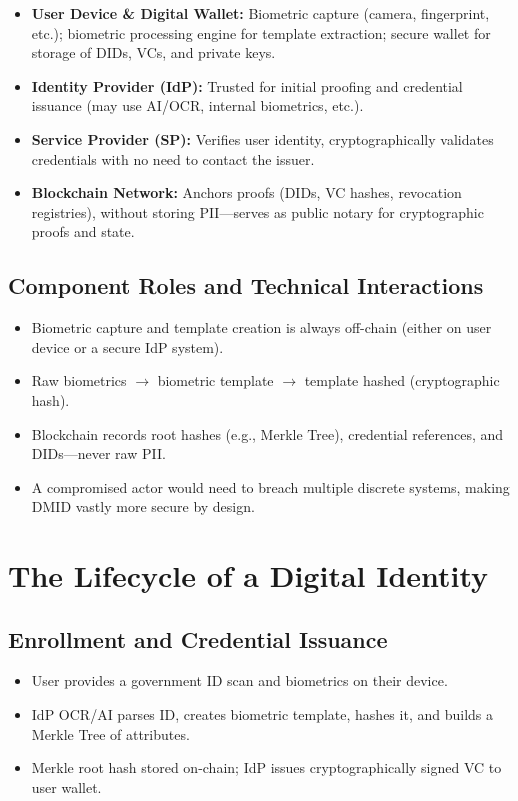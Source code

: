 \begin{itemize}
    \item \textbf{User Device \& Digital Wallet:} Biometric capture (camera, fingerprint, etc.); biometric processing engine for template extraction; secure wallet for storage of DIDs, VCs, and private keys.
    \item \textbf{Identity Provider (IdP):} Trusted for initial proofing and credential issuance (may use AI/OCR, internal biometrics, etc.).
    \item \textbf{Service Provider (SP):} Verifies user identity, cryptographically validates credentials with no need to contact the issuer.
    \item \textbf{Blockchain Network:} Anchors proofs (DIDs, VC hashes, revocation registries), without storing PII—serves as public notary for cryptographic proofs and state.
\end{itemize}

\subsection{Component Roles and Technical Interactions}
\begin{itemize}
    \item Biometric capture and template creation is always off-chain (either on user device or a secure IdP system).
    \item Raw biometrics $\rightarrow$ biometric template $\rightarrow$ template hashed (cryptographic hash).
    \item Blockchain records root hashes (e.g., Merkle Tree), credential references, and DIDs—never raw PII.
    \item A compromised actor would need to breach multiple discrete systems, making DMID vastly more secure by design.
\end{itemize}

\section{The Lifecycle of a Digital Identity}

\subsection{Enrollment and Credential Issuance}
\begin{itemize}
    \item User provides a government ID scan and biometrics on their device.
    \item IdP OCR/AI parses ID, creates biometric template, hashes it, and builds a Merkle Tree of attributes.
    \item Merkle root hash stored on-chain; IdP issues cryptographically signed VC to user wallet.
\end{itemize}

